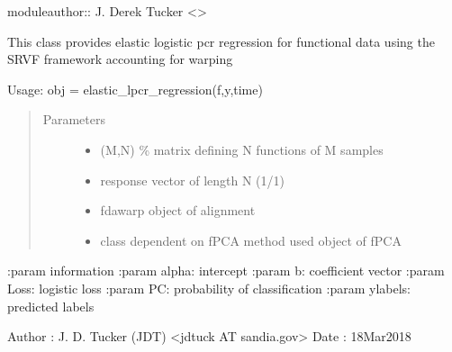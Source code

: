 \documentclass[letterpaper,10pt,english]{sphinxmanual}
\begin{document}
moduleauthor:: J. Derek Tucker \textless{}\textgreater{}

\begin{fulllineitems}
\label{\detokenize{pcr_regression:pcr_regression.elastic_lpcr_regression}}
This class provides elastic logistic pcr regression for functional 
data using the SRVF framework accounting for warping

Usage:  obj = elastic\_lpcr\_regression(f,y,time)
\begin{quote}\begin{description}
\item[{Parameters}] \leavevmode\begin{itemize}
\item {} 
 \textendash{} (M,N) \% matrix defining N functions of M samples

\item {} 
 \textendash{} response vector of length N (\sphinxhyphen{}1/1)

\item {} 
 \textendash{} fdawarp object of alignment

\item {} 
 \textendash{} class dependent on fPCA method used object of fPCA

\end{itemize}

\end{description}\end{quote}

:param information
:param alpha: intercept
:param b: coefficient vector
:param Loss: logistic loss
:param PC: probability of classification
:param ylabels: predicted labels

Author :  J. D. Tucker (JDT) \textless{}jdtuck AT sandia.gov\textgreater{}
Date   :  18\sphinxhyphen{}Mar\sphinxhyphen{}2018


\end{fulllineitems}
\end{document}
